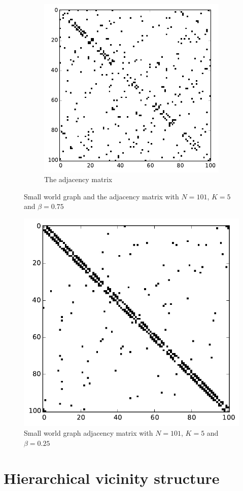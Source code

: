\begin{figure}[h]
\begin{subfigure}[b]{0.4\textwidth}
                \includegraphics[width=\textwidth]{images/topology/small_world_watts_adjacency_75.pdf}
                \caption{The adjacency matrix}
                \label{subfig:small world adjacency}
        \end{subfigure}
        \caption{Small world graph and the adjacency matrix with $N=101$, $K=5$ and $\beta =0.75$}
        \label{fig:small world adjacency graph}
\end{figure}

\begin{figure}[h]
\centering
\includegraphics[scale=0.7]{images/topology/small_world_watts_adjacency_25.pdf}
\caption{Small world graph adjacency matrix with $N=101$, $K=5$ and $\beta = 0.25$}
\label{fig:small world 25}
\end{figure}

\section{Hierarchical vicinity structure}
\label{sec:custom vicinity}